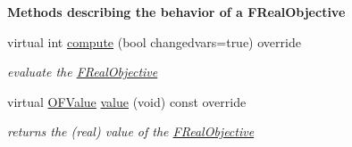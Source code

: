 \begin{Indent}\textbf{ Methods describing the behavior of a F\+Real\+Objective}\par
\begin{DoxyCompactItemize}
\item 
virtual int \mbox{\hyperlink{class_s_m_spp__di__unipi__it_1_1_f_real_objective_afc8ff54ab05d22f4cca0fb0bfbeb7a49}{compute}} (bool changedvars=true) override
\begin{DoxyCompactList}\small\item\em evaluate the \mbox{\hyperlink{class_s_m_spp__di__unipi__it_1_1_f_real_objective}{F\+Real\+Objective}} \end{DoxyCompactList}\item 
virtual \mbox{\hyperlink{class_s_m_spp__di__unipi__it_1_1_real_objective_ab8ce6bff9c21fdcd41e355167209301a}{O\+F\+Value}} \mbox{\hyperlink{class_s_m_spp__di__unipi__it_1_1_f_real_objective_a5733803d5bd031be89b835e0bfe3b9c2}{value}} (void) const override
\begin{DoxyCompactList}\small\item\em returns the (real) value of the \mbox{\hyperlink{class_s_m_spp__di__unipi__it_1_1_f_real_objective}{F\+Real\+Objective}} \end{DoxyCompactList}\end{DoxyCompactItemize}
\end{Indent}
